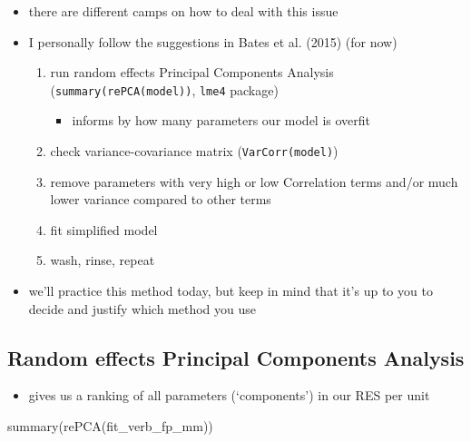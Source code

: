 \documentclass[
  letterpaper,
  DIV=11,
  numbers=noendperiod]{scrartcl}
\newenvironment{Shaded}{\begin{snugshade}}{\end{snugshade}}
\newcommand{\FunctionTok}[1]{\textcolor[rgb]{0.28,0.35,0.67}{#1}}
\newcommand{\NormalTok}[1]{\textcolor[rgb]{0.00,0.23,0.31}{#1}}
\providecommand{\tightlist}{%
  \setlength{\itemsep}{0pt}\setlength{\parskip}{0pt}}\usepackage{longtable,booktabs,array}
\begin{document}
\begin{itemize}
\tightlist
\item
  there are different camps on how to deal with this issue
\item
  I personally follow the suggestions in Bates et al. (2015) (for now)

  \begin{enumerate}
  \def\labelenumi{\arabic{enumi}.}
  \tightlist
  \item
    run random effects Principal Components Analysis
    (\texttt{summary(rePCA(model))}, \texttt{lme4} package)

    \begin{itemize}
    \tightlist
    \item
      informs by how many parameters our model is overfit
    \end{itemize}
  \item
    check variance-covariance matrix (\texttt{VarCorr(model)})
  \item
    remove parameters with very high or low Correlation terms and/or
    much lower variance compared to other terms
  \item
    fit simplified model
  \item
    wash, rinse, repeat
  \end{enumerate}
\item
  we'll practice this method today, but keep in mind that it's up to you
  to decide and justify which method you use
\end{itemize}

\hypertarget{random-effects-principal-components-analysis}{%
\subsection{Random effects Principal Components
Analysis}\label{random-effects-principal-components-analysis}}

\begin{itemize}
\tightlist
\item
  gives us a ranking of all parameters (`components') in our RES per
  unit
\end{itemize}

\begin{Shaded}
\begin{Highlighting}[]
\FunctionTok{summary}\NormalTok{(}\FunctionTok{rePCA}\NormalTok{(fit\_verb\_fp\_mm))}
\end{Highlighting}
\end{Shaded}
\end{document}
